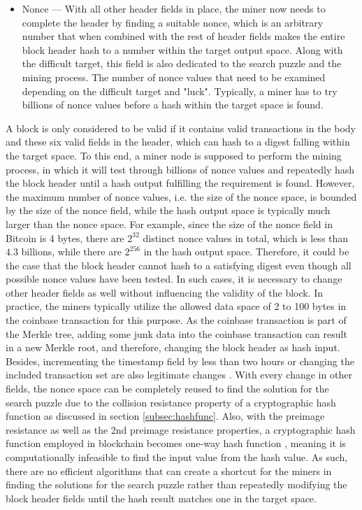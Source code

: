 \begin{itemize}
	\item Nonce --- With all other header fields in place, the miner now needs to complete the header by finding a suitable nonce, which is an arbitrary number that when combined with the rest of header fields makes the entire block header hash to a number within the target output space. Along with the difficult target, this field is also dedicated to the search puzzle and the mining process. The number of nonce values that need to be examined depending on the difficult target and "luck". Typically, a miner has to try billions of nonce values before a hash within the target space is found.
	 
 \end{itemize} 


A block is only considered to be valid if it contains valid transactions in the body and these six valid fields in the header, which can hash to a digest falling within the target space. To this end, a miner node is supposed to perform the mining process, in which it will test through billions of nonce values and repeatedly hash the block header until a hash output fulfilling the requirement is found. However, the maximum number of nonce values, i.e. the size of the nonce space, is bounded by the size of the nonce field, while the hash output space is typically much larger than the nonce space. For example, since the size of the nonce field in Bitcoin is 4 bytes, there are $2^{32}$ distinct nonce values in total, which is less than $4.3$ billions, while there are $2^{256}$ in the hash output space. Therefore, it could be the case that the block header cannot hash to a satisfying digest even though all possible nonce values have been tested. In such cases, it is necessary to change other header fields as well without influencing the validity of the block. In practice, the miners typically utilize the allowed data space of 2 to 100 bytes in the coinbase transaction for this purpose. As the coinbase transaction is part of the Merkle tree, adding some junk data into the coinbase transaction can result in a new Merkle root, and therefore, changing the block header as hash input. Besides, incrementing the timestamp field by less than two hours or changing the included transaction set are also legitimate changes \cite{antonopoulos2017mastering}. With every change in other fields, the nonce space can be completely reused to find the solution for the search puzzle due to the collision resistance property of a cryptographic hash function as discussed in section \ref{subsec:hashfunc}. Also, with the preimage resistance as well as the 2nd preimage resistance properties, a cryptographic hash function employed in blockchain becomes one-way hash function \cite{menezes1997handbook}, meaning it is computationally infeasible to find the input value from the hash value. As such, there are no efficient algorithms that can create a shortcut for the miners in finding the solutions for the search puzzle rather than repeatedly modifying the block header fields until the hash result matches one in the target space.

